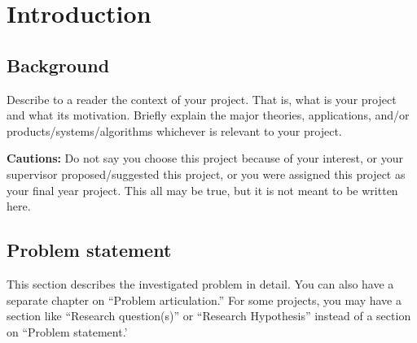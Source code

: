 \chapter{Introduction}
\label{ch:intro}

\cite{Gebrechorkos2019}



\section{Background}
\label{sec:into_back}
Describe to a reader the context of your project. That is, what is your project and what its motivation. Briefly explain the major theories, applications, and/or products/systems/algorithms whichever is relevant to your project.

\textbf{Cautions:} Do not say you choose this project because of your interest, or your supervisor proposed/suggested this project, or you were assigned this project as your final year project. This all may be true, but it is not meant to be written here.

\section{Problem statement}
\label{sec:intro_prob_art}
This section describes the investigated problem in detail. You can also have a separate chapter on ``Problem articulation.''  For some projects, you may have a section like ``Research question(s)'' or ``Research Hypothesis'' instead of a section on ``Problem statement.'


